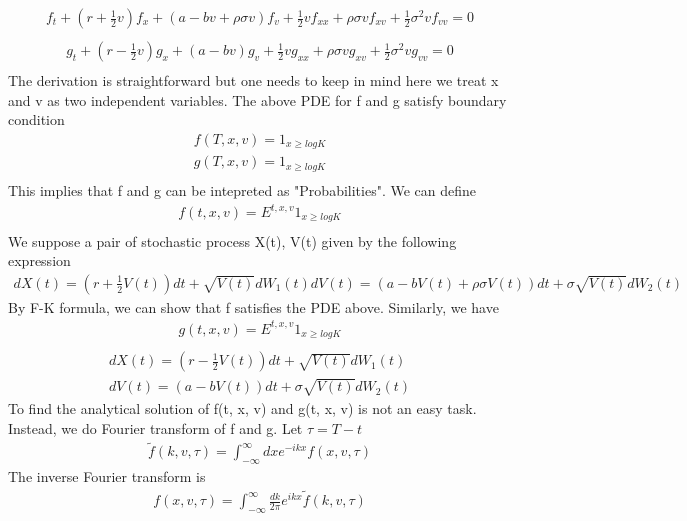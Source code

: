 \documentclass[a4paper]{article}
\begin{document}
\begin{align*}
	f_t + (r + \frac{1}{2}v)f_x + (a-bv+\rho \sigma v)f_v 
	+ \frac{1}{2}  v f_{xx} + \rho \sigma vf_{xv}
        +\frac{1}{2} \sigma^2 vf_{vv} = 0\\
\end{align*}
\begin{align*}
	g_t + (r - \frac{1}{2}v)g_x + (a-bv)g_v 
	+ \frac{1}{2}  v g_{xx} + \rho \sigma vg_{xv}
        +\frac{1}{2} \sigma^2 vg_{vv} = 0\\
\end{align*}
The derivation is straightforward but one needs to keep in mind here we treat x and v as two independent variables. The above PDE for f and g satisfy boundary condition
\begin{align*}
	f(T, x, v) = 1_{x\geq logK}\\
	g(T, x, v) = 1_{x\geq logK}\\
\end{align*}
This implies that f and g can be intepreted as "Probabilities". We can define
\begin{align*}
	f(t, x, v) = E^{t,x,v}1_{x\geq logK}\\
\end{align*}
We suppose a pair of stochastic process X(t), V(t) given by the following expression
\begin{align*}
	dX(t) = (r+\frac{1}{2}V(t))dt + \sqrt{V(t)}dW_1(t)
	dV(t) = (a-bV(t)+ \rho \sigma V(t))dt + \sigma \sqrt{V(t)}dW_2(t)
\end{align*}
By F-K formula, we can show that f satisfies the PDE above. Similarly, we have
\begin{align*}
	g(t, x, v) = E^{t,x,v} 1_{x\geq logK}\\
\end{align*}
\begin{align*}
	dX(t) = (r-\frac{1}{2}V(t))dt + \sqrt{V(t)}dW_1(t)\\
	dV(t) = (a-bV(t))dt + \sigma \sqrt{V(t)}dW_2(t)
\end{align*}
To find the analytical solution of f(t, x, v) and g(t, x, v) is not an easy task. Instead, we do Fourier transform of f and g. Let $\tau = T-t$
\begin{align*}
	\tilde f(k, v, \tau) = \int_{-\infty}^{\infty}dx e^{-ikx}f(x, v, \tau)
\end{align*}
The inverse Fourier transform is
\begin{align*}
	f(x, v, \tau) = \int_{-\infty}^{\infty}\frac{dk}{2\pi} e^{ikx}
	\tilde f(k, v, \tau)
\end{align*}
\end{document}

